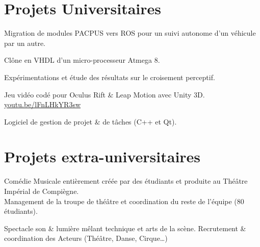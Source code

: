 \documentclass[]{cv-template}
\begin{document}
\begin{minipage}[t]{0.65\textwidth}


\section{Projets Universitaires}
Migration de modules PACPUS vers ROS pour un suivi autonome d'un véhicule par un autre.


Clône en VHDL d'un micro-processeur Atmega 8.


Expérimentations et étude des résultats sur le croisement perceptif.


Jeu vidéo codé pour Oculus Rift \& Leap Motion avec Unity 3D. \\
\faCaretRight \href{youtu.be/lFnLHkYR3sw}{  youtu.be/lFnLHkYR3sw}


Logiciel de gestion de projet \& de tâches (C++ et Qt).

\section{Projets extra-universitaires}
Comédie Musicale entièrement créée par des étudiants et produite au Théâtre Impérial de Compiègne. \\
Management de la troupe de théâtre et coordination du reste de l'équipe (80 étudiants).


Spectacle son \& lumière mêlant technique et arts de la scène. Recrutement \& coordination des Acteurs (Théâtre, Danse, Cirque\ldots)
\sectionsep 

\end{minipage} 
\end{document}
